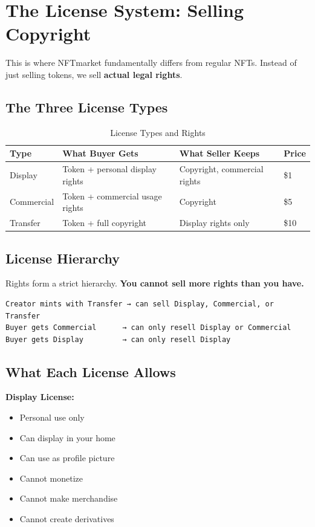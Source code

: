 \documentclass[11pt,a4paper]{article}
\newcommand{\keyword}[1]{\textbf{\textcolor{accentcolor}{#1}}}
\begin{document}
\newpage
\section{The License System: Selling Copyright}

This is where NFTmarket fundamentally differs from regular NFTs. Instead of just selling tokens, we sell \keyword{actual legal rights}.

\subsection{The Three License Types}

\begin{table}[h]
\centering
\begin{tabular}{@{}L{2.5cm}L{4cm}L{4cm}l@{}}
\toprule
\textbf{Type} & \textbf{What Buyer Gets} & \textbf{What Seller Keeps} & \textbf{Price} \\
\midrule
Display & Token + personal display rights & Copyright, commercial rights & \$1 \\
Commercial & Token + commercial usage rights & Copyright & \$5 \\
Transfer & Token + full copyright & Display rights only & \$10 \\
\bottomrule
\end{tabular}
\caption{License Types and Rights}
\end{table}

\subsection{License Hierarchy}

Rights form a strict hierarchy. \textbf{You cannot sell more rights than you have.}

\begin{mdframed}[style=codeblock]
\begin{verbatim}
Creator mints with Transfer → can sell Display, Commercial, or Transfer
Buyer gets Commercial      → can only resell Display or Commercial
Buyer gets Display         → can only resell Display
\end{verbatim}
\end{mdframed}

\subsection{What Each License Allows}

\textbf{Display License:}
\begin{itemize}
    \item Personal use only
    \item Can display in your home
    \item Can use as profile picture
    \item Cannot monetize
    \item Cannot make merchandise
    \item Cannot create derivatives
\end{itemize}
\end{document}

